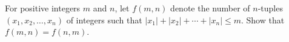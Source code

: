 For positive integers $m$ and $n$, let $f(m,n)$ denote the number of
$n$-tuples $(x_1,x_2,\dots,x_n)$ of integers such that
$|x_1| + |x_2| + \cdots + |x_n| \leq m$.
Show that $f(m,n) = f(n,m)$.
